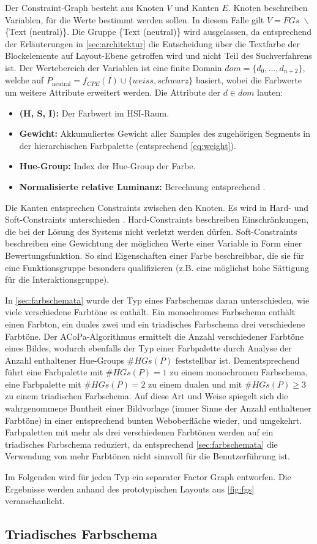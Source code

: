 Der Constraint-Graph besteht aus Knoten $V$ und Kanten $E$. Knoten beschreiben Variablen, für die Werte bestimmt werden sollen. In diesem Falle gilt $V = FGs\; \backslash$ \{Text (neutral)\}. Die Gruppe \{Text (neutral)\} wird ausgelassen, da entsprechend der Erläuterungen in \autoref{sec:architektur} die Entscheidung über die Textfarbe der Blockelemente auf Layout-Ebene  getroffen wird und nicht Teil des Suchverfahrens ist. Der Wertebereich der Variablen ist eine finite Domain $dom = \{d_0, ..., d_{n+2}\}$, welche auf $P_\text{neutral} = f_{CPE}(I) \cup \{weiss, schwarz\}$ basiert, wobei die Farbwerte um weitere Attribute erweitert werden. Die Attribute der $d \in dom$ lauten:

\begin{itemize}
	\item \textbf{(H, S, I):} Der Farbwert im HSI-Raum.
	\item \textbf{Gewicht:} Akkumuliertes Gewicht aller Samples des zugehörigen Segments in der hierarchischen Farbpalette (entsprechend \autoref{eq:weight}).
	\item \textbf{Hue-Group:} Index der Hue-Group der Farbe.
	\item \textbf{Normalisierte relative Luminanz:} Berechnung entsprechend \citet{wcag-rel-luminance}.
\end{itemize}

Die Kanten entsprechen Constraints zwischen den Knoten. Es wird in Hard- und Soft-Constraints unterschieden \citep{patterns}. Hard-Constraints beschreiben Einschränkungen, die bei der Lösung des Systems nicht verletzt werden dürfen. Soft-Constraints beschreiben eine Gewichtung der möglichen Werte einer Variable in Form einer Bewertungsfunktion. So sind Eigenschaften einer Farbe beschreibbar, die sie für eine Funktionsgruppe besonders qualifizieren (z.B. eine möglichst hohe Sättigung für die Interaktionsgruppe).

In \autoref{sec:farbschemata} wurde der Typ eines Farbschemas daran unterschieden, wie viele verschiedene Farbtöne es enthält. Ein monochromes Farbschema enthält einen Farbton, ein duales zwei und ein triadisches Farbschema drei verschiedene Farbtöne. Der ACoPa-Algorithmus ermittelt die Anzahl verschiedener Farbtöne eines Bildes, wodurch ebenfalls der Typ einer Farbpalette durch Analyse der Anzahl enthaltener Hue-Groups $\#HGs(P)$ feststellbar ist. Dementsprechend führt eine Farbpalette mit $\#HGs(P) = 1$ zu einem monochromen Farbschema, eine Farbpalette mit $\#HGs(P) = 2$ zu einem dualen und mit $\#HGs(P) \geq 3$ zu einem triadischen Farbschema. Auf diese Art und Weise spiegelt sich die wahrgenommene \glqq{}Buntheit\grqq{} einer Bildvorlage (immer Sinne der Anzahl enthaltener Farbtöne) in einer entsprechend bunten Weboberfläche wieder, und umgekehrt. Farbpaletten mit mehr als drei verschiedenen Farbtönen werden auf ein triadisches Farbschema reduziert, da entsprechend \autoref{sec:farbschemata} die Verwendung von mehr Farbtönen nicht sinnvoll für die Benutzerführung ist.

Im Folgenden wird für jeden Typ ein separater Factor Graph entworfen. Die Ergebnisse werden anhand des prototypischen Layouts aus \autoref{fig:fgs} veranschaulicht.

\subsection{Triadisches Farbschema}



